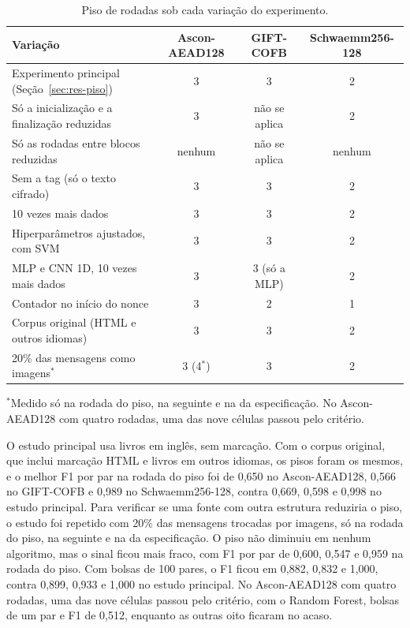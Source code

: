\begin{table}[htb]
\centering
\caption{Piso de rodadas sob cada variação do experimento.}
\label{tab:res-robustez}
\footnotesize
\setlength{\tabcolsep}{4pt}
\begin{tabular}{lccc}
\toprule
Variação & Ascon-AEAD128 & GIFT-COFB & Schwaemm256-128 \\
\midrule
Experimento principal (Seção~\ref{sec:res-piso}) & 3 & 3 & 2 \\
Só a inicialização e a finalização reduzidas & 3 & não se aplica & 2 \\
Só as rodadas entre blocos reduzidas & nenhum & não se aplica & nenhum \\
Sem a tag (só o texto cifrado) & 3 & 3 & 2 \\
10 vezes mais dados & 3 & 3 & 2 \\
Hiperparâmetros ajustados, com SVM & 3 & 3 & 2 \\
MLP e CNN 1D, 10 vezes mais dados & 3 & 3 (só a MLP) & 2 \\
Contador no início do nonce & 3 & 2 & 1 \\
Corpus original (HTML e outros idiomas) & 3 & 3 & 2 \\
20\% das mensagens como imagens$^{*}$ & 3 (4$^{*}$) & 3 & 2 \\
\bottomrule
\end{tabular}
\par\smallskip\footnotesize $^{*}$Medido só na rodada do piso, na seguinte e na da especificação. No Ascon-AEAD128 com quatro rodadas, uma das nove células passou pelo critério.
\end{table}

O estudo principal usa livros em inglês, sem marcação. Com o corpus original, que inclui marcação HTML e livros em outros idiomas, os pisos foram os mesmos, e o melhor F1 por par na rodada do piso foi de 0,650 no Ascon-AEAD128, 0,566 no GIFT-COFB e 0,989 no Schwaemm256-128, contra 0,669, 0,598 e 0,998 no estudo principal. Para verificar se uma fonte com outra estrutura reduziria o piso, o estudo foi repetido com 20\% das mensagens trocadas por imagens, só na rodada do piso, na seguinte e na da especificação. O piso não diminuiu em nenhum algoritmo, mas o sinal ficou mais fraco, com F1 por par de 0,600, 0,547 e 0,959 na rodada do piso. Com bolsas de 100 pares, o F1 ficou em 0,882, 0,832 e 1,000, contra 0,899, 0,933 e 1,000 no estudo principal. No Ascon-AEAD128 com quatro rodadas, uma das nove células passou pelo critério, com o Random Forest, bolsas de um par e F1 de 0,512, enquanto as outras oito ficaram no acaso.

